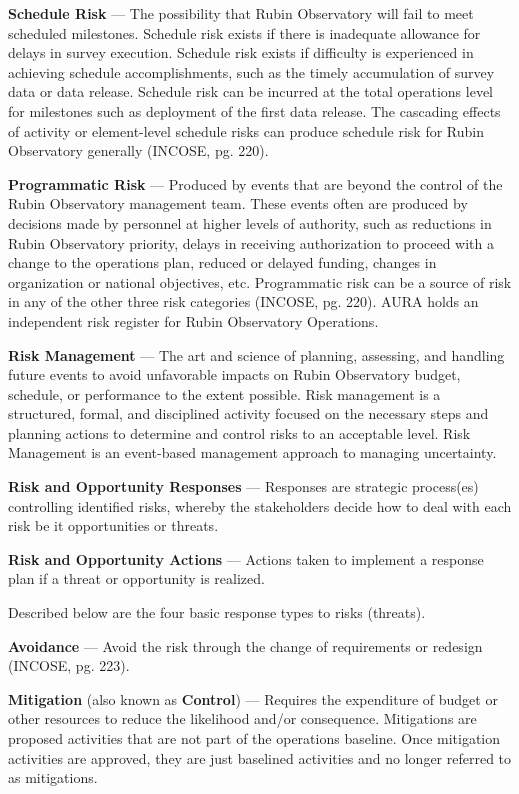 \textbf{Schedule Risk} ---
The possibility that Rubin Observatory will fail to meet scheduled milestones.
Schedule risk exists if there is inadequate allowance for delays in survey execution.
Schedule risk exists if difficulty is experienced in achieving schedule accomplishments, such as the timely accumulation of survey data or data release.
Schedule risk can be incurred at the total operations level for milestones such as deployment of the first data release.
The cascading effects of activity or element-level schedule risks can produce schedule risk for Rubin Observatory generally (INCOSE, pg. 220).

\textbf{Programmatic Risk} ---
Produced by events that are beyond the control of the Rubin Observatory management team.
These events often are produced by decisions made by personnel at higher levels of authority, such as reductions in Rubin Observatory priority, delays in receiving authorization to proceed with a change to the operations plan, reduced or delayed funding, changes in organization or national objectives, etc.
Programmatic risk can be a source of risk in any of the other three risk categories (INCOSE, pg. 220).
AURA holds an independent risk register for Rubin Observatory Operations.

\textbf{Risk Management} ---
The art and science of planning, assessing, and handling future events to avoid unfavorable impacts on Rubin Observatory budget, schedule, or performance to the extent possible.
Risk management is a structured, formal, and disciplined activity focused on the necessary steps and planning actions to determine and control risks to an acceptable level.
Risk Management is an event-based management approach to managing uncertainty.

\textbf{Risk and Opportunity Responses} ---
Responses are strategic process(es) controlling identified risks, whereby the stakeholders decide how to deal with each risk be it opportunities or threats.

\textbf{Risk and Opportunity Actions} ---
Actions taken to implement a response plan if a threat or opportunity is realized.

Described below are the four basic response types to risks (threats).

\textbf{Avoidance} ---
Avoid the risk through the change of requirements or redesign (INCOSE, pg. 223).

\textbf{Mitigation} (also known as \textbf{Control}) ---
Requires the expenditure of budget or other resources to reduce the likelihood and/or consequence.
Mitigations are proposed activities that are not part of the operations baseline.
Once mitigation activities are approved, they are just baselined activities and no longer referred to as mitigations.


